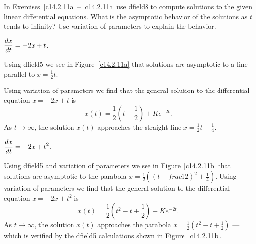 \documentclass{ximera}
\begin{document}
\noindent In Exercises~\ref{c14.2.11a} -- \ref{c14.2.11c} use 
{\sf dfield8} 
to compute solutions to the given linear differential equations.  What is 
the asymptotic behavior of the solutions as $t$ tends to infinity?  Use 
variation of parameters to explain the behavior.
\begin{exercise}   \label{c14.2.11a}
$\displaystyle\frac{dx}{dt} = -2 x + t$.

\begin{solution}
Using {\sf dfield5} we see in Figure~\ref{c14.2.11a} that
solutions are asymptotic to a line parallel to $x=\frac{1}{2}t$.

\begin{figure}[htb]
     \centerline{%
     }
\end{figure} 
Using variation of parameters we find that the general solution to the
differential equation $\dot{x}=-2x+t$ is 
\[
x(t) = \frac{1}{2}\left(t-\frac{1}{2}\right) +Ke^{-2t}.
\]
As $t\to\infty$, the solution $x(t)$ approaches the straight line 
$x= \frac{1}{2}t-\frac{1}{4}$.

\end{solution}
\end{exercise}
\begin{exercise}   \label{c14.2.11b}
$\displaystyle\frac{dx}{dt} = -2 x + t^2$.

\begin{solution}
Using {\sf dfield5} and variation of parameters we see in 
Figure~\ref{c14.2.11b} that solutions are asymptotic to the
parabola $x=\frac{1}{2}((t-frac{1}{2})^2+\frac{1}{4})$.
Using variation of parameters we find that the general solution to the
differential equation $\dot{x}=-2x+t^2$ is 
\[
x(t) = \frac{1}{2}\left(t^2-t+\frac{1}{2}\right) + Ke^{-2t}.
\]
As $t\to\infty$, the solution $x(t)$ approaches the parabola  
$x= \frac{1}{2}(t^2-t+\frac{1}{2})$ --- which is verified by the 
{\sf dfield5} calculations shown in Figure~\ref{c14.2.11b}.

\begin{figure}[htb]
     \centerline{%
     }
\end{figure} 

\end{solution}
\end{exercise}
\end{document}
